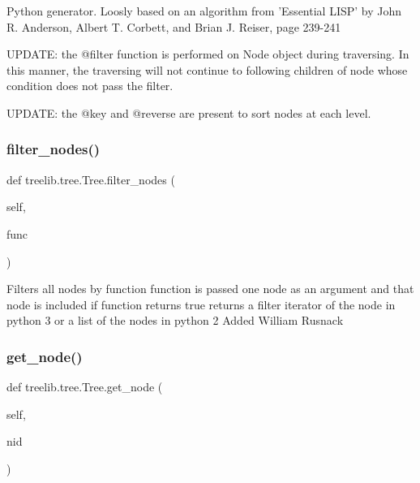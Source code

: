 \begin{DoxyVerb}Python generator. Loosly based on an algorithm from
'Essential LISP' by John R. Anderson, Albert T. Corbett, and
Brian J. Reiser, page 239-241

UPDATE: the @filter function is performed on Node object during
traversing. In this manner, the traversing will not continue to
following children of node whose condition does not pass the filter.

UPDATE: the @key and @reverse are present to sort nodes at each
level.
\end{DoxyVerb}
 \mbox{\label{classtreelib_1_1tree_1_1Tree_ae251cc543bdc07c80290cf5a3d6eb560}} 
\subsubsection{\texorpdfstring{filter\+\_\+nodes()}{filter\_nodes()}}
{\footnotesize\ttfamily def treelib.\+tree.\+Tree.\+filter\+\_\+nodes (\begin{DoxyParamCaption}\item[{}]{self,  }\item[{}]{func }\end{DoxyParamCaption})}

\begin{DoxyVerb}Filters all nodes by function
function is passed one node as an argument and that node is included if function returns true
returns a filter iterator of the node in python 3 or a list of the nodes in python 2
Added William Rusnack
\end{DoxyVerb}
 \mbox{\label{classtreelib_1_1tree_1_1Tree_a0f2ed5ef9b4f364c872435f1a170a9c5}} 
\subsubsection{\texorpdfstring{get\+\_\+node()}{get\_node()}}
{\footnotesize\ttfamily def treelib.\+tree.\+Tree.\+get\+\_\+node (\begin{DoxyParamCaption}\item[{}]{self,  }\item[{}]{nid }\end{DoxyParamCaption})}

